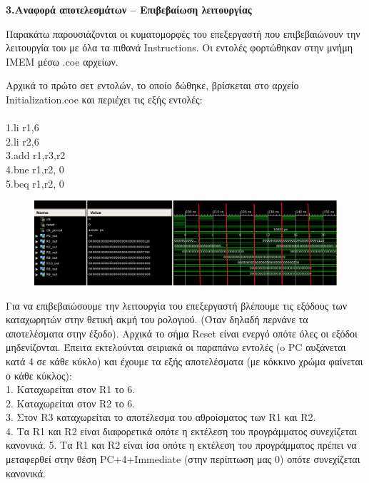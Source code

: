 \newpage

{ \large \bfseries 3.Αναφορά αποτελεσμάτων – Επιβεβαίωση λειτουργίας }\\ %

\begin{justify}
    Παρακάτω παρουσιάζονται οι κυματομορφές του επεξεργαστή
    που επιβεβαιώνουν την λειτουργία του με όλα τα πιθανά
    \textlatin{Instructions}. Οι εντολές φορτώθηκαν στην μνήμη
    \textlatin{IMEM} μέσω \textlatin{.coe} αρχείων.
\end{justify}

\begin{justify}
    Αρχικά το πρώτο σετ εντολών, το οποίο δώθηκε, βρίσκεται
    στο αρχείο \textlatin{Initialization.coe} και περιέχει τις εξής
    εντολές:\\\\
    \textlatin{1.li r1,6}\\
    \textlatin{2.li r2,6}\\
    \textlatin{3.add r1,r3,r2}\\
    \textlatin{4.bne r1,r2, 0}\\
    \textlatin{5.beq r1,r2, 0}
\end{justify}

\begin{figure}[h]
    \raggedright
    \hspace{-1cm}
    \includegraphics[width=1.1\textwidth]{Images/Screenshot_1.png} %
\end{figure}

\begin{justify}
    Για να επιβεβαιώσουμε την λειτουργία του επεξεργαστή
    βλέπουμε τις εξόδους των καταχωρητών στην θετική
    ακμή του ρολογιού. (Όταν δηλαδή περνάνε τα
    αποτελέσματα στην έξοδο).
    Αρχικά το σήμα \textlatin{Reset} είναι ενεργό
    οπότε όλες οι εξόδοι μηδενίζονται. Έπειτα εκτελούνται
    σειριακά οι παραπάνω εντολές (o \textlatin{PC} αυξάνεται
    κατά 4 σε κάθε κύκλο) και έχουμε τα εξής αποτελέσματα
    (με κόκκινο χρώμα φαίνεται ο κάθε κύκλος):\\
    1. Καταχωρείται στον \textlatin{R1} το 6.\\
    2. Καταχωρείται στον \textlatin{R2} το 6.\\
    3. Στον \textlatin{R3} καταχωρείται το αποτέλεσμα
    του αθροίσματος των \textlatin{R1} και \textlatin{R2}.\\
    4. Τα \textlatin{R1} και \textlatin{R2} είναι διαφορετικά
    οπότε η εκτέλεση του προγράμματος συνεχίζεται κανονικά.
    5. Τα \textlatin{R1} και \textlatin{R2} είναι ίσα οπότε
    η εκτέλεση του προγράμματος πρέπει να μεταφερθεί στην θέση
    \textlatin{PC+4+Immediate} (στην περίπτωση μας 0) οπότε
    συνεχίζεται κανονικά.
\end{justify}


